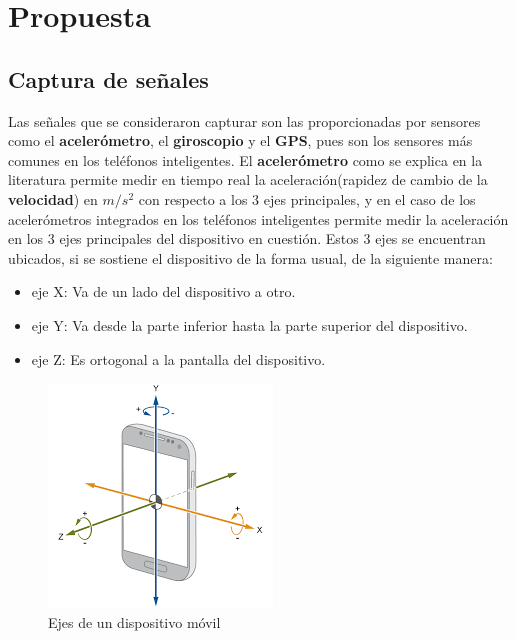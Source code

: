 \chapter{Propuesta}\label{chapter:proposal}

\section*{Captura de señales}
	Las señales que se consideraron capturar son las proporcionadas por sensores como el \textbf{acelerómetro},
	el \textbf{giroscopio} y el \textbf{GPS}, pues son los sensores más comunes en los teléfonos inteligentes. El
	\textbf{acelerómetro} como se explica en la literatura permite medir en tiempo real la aceleración(rapidez de
	cambio de la \textbf{velocidad}) en $m/s^2$ con respecto a los 3 ejes principales, y en el caso de los
	acelerómetros integrados en los teléfonos inteligentes permite medir la aceleración en los 3 ejes
	principales del dispositivo en cuestión. Estos 3 ejes se encuentran ubicados, si se sostiene el
	dispositivo de la forma usual, de la siguiente manera:

	\begin{itemize}
		\item eje X: Va de un lado del dispositivo a otro.
		\item eje Y: Va desde la parte inferior hasta la parte superior del dispositivo.
		\item eje Z: Es ortogonal a la pantalla del dispositivo.
	\end{itemize}
	
	\begin{figure}[htb]
		\centering
		\includegraphics[scale = 0.5]{Graphics/mobile_phone_axis.png}
		\caption{Ejes de un dispositivo móvil}
		\label{fig:1}
	\end{figure}

